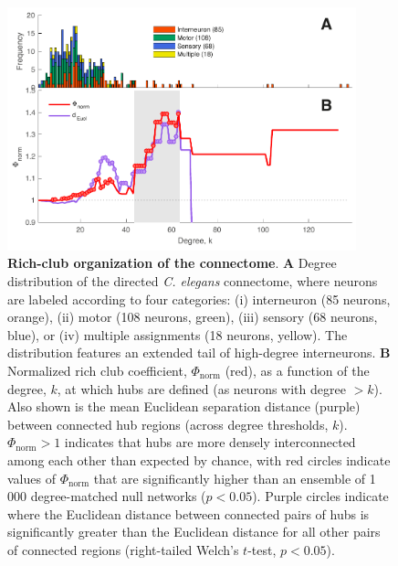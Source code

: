 \documentclass[10pt,letterpaper]{article}
\begin{document}


\begin{figure}[h]
   \centering
    \includegraphics[width=0.9\textwidth]{topologicalRCall.pdf}
 \caption{\textbf{Rich-club organization of the connectome}.
\textbf{A} Degree distribution of the directed \textit{C. elegans} connectome, where neurons are labeled according to four categories:
(i) interneuron (85 neurons, orange),
(ii) motor (108 neurons, green),
(iii) sensory (68 neurons, blue), or
(iv) multiple assignments (18 neurons, yellow).
The distribution features an extended tail of high-degree interneurons.
\textbf{B}
Normalized rich club coefficient, $\Phi_\mathrm{norm}$ (red), as a function of the degree, $k$, at which hubs are defined (as neurons with degree $>k$).
Also shown is the mean Euclidean separation distance (purple) between connected hub regions (across degree thresholds, $k$).
$\Phi_\mathrm{norm} > 1$ indicates that hubs are more densely interconnected among each other than expected by chance, with red circles indicate values of $\Phi_\mathrm{norm}$ that are significantly higher than an ensemble of 1\,000 degree-matched null networks ($p < 0.05$).
Purple circles indicate where the Euclidean distance between connected pairs of hubs is significantly greater than the Euclidean distance for all other pairs of connected regions (right-tailed Welch's $t$-test, $p < 0.05$).
}
 \label{fig:topology_rich}
 \end{figure}
\end{document}
